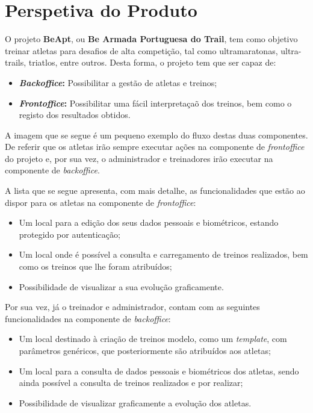 \section{Perspetiva do Produto}

O projeto \textbf{BeApt}, ou \textbf{Be Armada Portuguesa do Trail}, tem como objetivo treinar atletas para desafios de alta competição, tal como ultramaratonas, ultra-trails, triatlos, entre outros. Desta forma, o projeto tem que ser capaz de:

\begin{itemize}
	\item \textbf{\textit{Backoffice}:} Possibilitar a gestão de atletas e treinos;
	\item \textbf{\textit{Frontoffice}:} Possibilitar uma fácil interpretaçaõ dos treinos, bem como o registo dos resultados obtidos.
\end{itemize}

A imagem que se segue é um pequeno exemplo do fluxo destas duas componentes. De referir que os atletas irão sempre executar ações na componente de \textit{frontoffice} do projeto e, por sua vez, o administrador e treinadores irão executar na componente de \textit{backoffice}.


A lista que se segue apresenta, com mais detalhe, as funcionalidades que estão ao dispor para os atletas na componente de \textit{frontoffice}:

\begin{itemize}
	\item Um local para a edição dos seus dados pessoais e biométricos, estando protegido por autenticação;
	\item Um local onde é possível a consulta e carregamento de treinos realizados, bem como os treinos que lhe foram atribuídos;
	\item Possibilidade de visualizar a sua evolução graficamente.
\end{itemize}

Por sua vez, já o treinador e administrador, contam com as seguintes funcionalidades na componente de \textit{backoffice}:

\begin{itemize}
	\item Um local destinado à criação de treinos modelo, como um \textit{template}, com parâmetros genéricos, que posteriormente são atribuídos aos atletas;
	\item Um local para a consulta de dados pessoais e biométricos dos atletas, sendo ainda possível a consulta de treinos realizados e por realizar;
	\item Possibilidade de visualizar graficamente a evolução dos atletas.
\end{itemize}